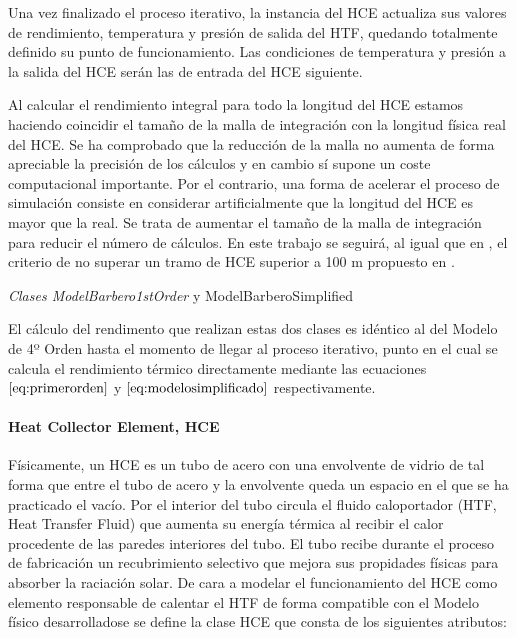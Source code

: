 \documentclass[11pt]{article}
\begin{document}
Una vez finalizado el proceso iterativo, la instancia del HCE actualiza
sus valores de rendimiento, temperatura y presión de salida del HTF,
quedando totalmente definido su punto de funcionamiento. Las condiciones
de temperatura y presión a la salida del HCE serán las de entrada del
HCE siguiente.

Al calcular el rendimiento integral para todo la longitud del HCE
estamos haciendo coincidir el tamaño de la malla de integración con la
longitud física real del HCE. Se ha comprobado que la reducción de la
malla no aumenta de forma apreciable la precisión de los cálculos y en
cambio sí supone un coste computacional importante. Por el contrario,
una forma de acelerar el proceso de simulación consiste en considerar
artificialmente que la longitud del HCE es mayor que la real. Se trata
de aumentar el tamaño de la malla de integración para reducir el número
de cálculos. En este trabajo se seguirá, al igual que en
\cite{1022085/7TD8VTGL}, el criterio de no superar un tramo de HCE
superior a 100 m propuesto en \cite{1022085/CYH3NJEG}.

\emph{Clases ModelBarbero1stOrder} y ModelBarberoSimplified

El cálculo del rendimento que realizan estas dos clases es idéntico al
del Modelo de 4º Orden hasta el momento de llegar al proceso iterativo,
punto en el cual se calcula el rendimiento térmico directamente mediante
las ecuaciones \(\eqref{eq:primerorden}\) y
\(\eqref{eq:modelosimplificado}\) respectivamente.

\hypertarget{heat-collector-element-hce}{%
\paragraph{Heat Collector Element,
HCE}\label{heat-collector-element-hce}}

Físicamente, un HCE es un tubo de acero con una envolvente de vidrio de
tal forma que entre el tubo de acero y la envolvente queda un espacio en
el que se ha practicado el vacío. Por el interior del tubo circula el
fluido caloportador (HTF, Heat Transfer Fluid) que aumenta su energía
térmica al recibir el calor procedente de las paredes interiores del
tubo. El tubo recibe durante el proceso de fabricación un recubrimiento
selectivo que mejora sus propidades físicas para absorber la raciación
solar. De cara a modelar el funcionamiento del HCE como elemento
responsable de calentar el HTF de forma compatible con el Modelo físico
desarrolladose se define la clase HCE que consta de los siguientes
atributos:
\end{document}
